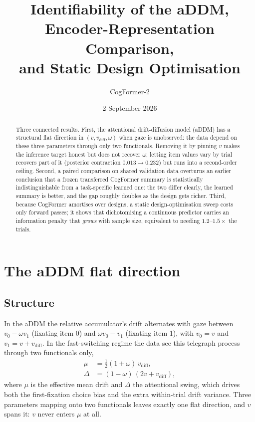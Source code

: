 \documentclass[11pt]{article}
\title{Identifiability of the aDDM, Encoder-Representation Comparison,\\
and Static Design Optimisation}
\author{CogFormer-2}
\date{2 September 2026}
\newcommand{\vdiff}{v_{\mathrm{diff}}}
\newcommand{\Dch}{\Delta}
\begin{document}
\maketitle

\begin{abstract}
Three connected results. First, the attentional drift-diffusion model (aDDM) has a
structural flat direction in $(v, \vdiff, \omega)$ when gaze is unobserved: the data
depend on these three parameters through only two functionals. Removing it by pinning
$v$ makes the inference target honest but does not recover $\omega$; letting item
values vary by trial recovers part of it (posterior contraction $0.013 \to 0.232$) but
runs into a second-order ceiling. Second, a paired comparison on shared validation data
overturns an earlier conclusion that a frozen transferred CogFormer summary is
statistically indistinguishable from a task-specific learned one: the two differ
clearly, the learned summary is better, and the gap roughly doubles as the design gets
richer. Third, because CogFormer amortises over designs, a static design-optimisation
sweep costs only forward passes; it shows that dichotomising a continuous predictor
carries an information penalty that \emph{grows} with sample size, equivalent to
needing $1.2$--$1.5\times$ the trials.
\end{abstract}

\section{The aDDM flat direction}

\subsection{Structure}

In the aDDM the relative accumulator's drift alternates with gaze between
$v_0 - \omega v_1$ (fixating item 0) and $\omega v_0 - v_1$ (fixating item 1), with
$v_0 = v$ and $v_1 = v + \vdiff$. In the fast-switching regime the data see this
telegraph process through two functionals only,
\begin{align}
  \mu     &= \tfrac{1}{2}(1+\omega)\,\vdiff, \label{eq:mu}\\
  \Dch    &= (1-\omega)\,(2v + \vdiff), \label{eq:delta}
\end{align}
where $\mu$ is the effective mean drift and $\Dch$ the attentional swing, which drives
both the first-fixation choice bias and the extra within-trial drift variance. Three
parameters mapping onto two functionals leaves exactly one flat direction, and $v$
spans it: $v$ never enters $\mu$ at all.
\end{document}
